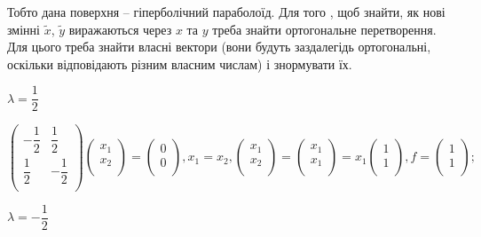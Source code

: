 Тобто дана поверхня -- гіперболічний параболоїд. Для того , щоб знайти, як
нові змінні $\tilde{x}$, $\tilde{y}$ виражаються через $x$ та $y$ треба знайти ортогональне
перетворення. Для цього треба знайти власні вектори (вони будуть
заздалегідь ортогональні, оскільки відповідають різним власним числам) і
знормувати їх.

$\lambda = \dfrac{1}{2}$

$$\begin{pmatrix}
	-\dfrac{1}{2} & \dfrac{1}{2} \\
	\dfrac{1}{2} & -\dfrac{1}{2} \\
\end{pmatrix} \begin{pmatrix}
	x_1 \\
	x_2 \\
\end{pmatrix} = \begin{pmatrix}
	0 \\
	0 \\
\end{pmatrix}, x_1 = x_2, \begin{pmatrix}
	x_1 \\
	x_2 \\
\end{pmatrix} = \begin{pmatrix}
	x_1 \\
	x_1 \\
\end{pmatrix} = x_1 \begin{pmatrix}
	1 \\
	1 \\
\end{pmatrix}, f = \begin{pmatrix}
	1 \\
	1 \\
\end{pmatrix};$$


$\lambda = -\dfrac{1}{2}$

